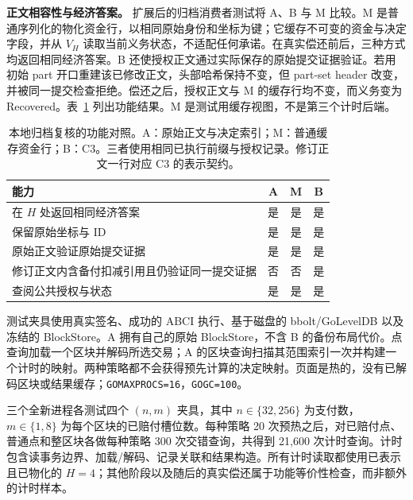 \noindent\textbf{正文相容性与经济答案。}
扩展后的归档消费者测试将 A、B 与 M 比较。M 是普通序列化的物化资金行，以相同原始身份和坐标为键；它缓存不可变的资金与决定字段，并从 $V_H$ 读取当前义务状态，不适配任何承诺。在真实偿还前后，三种方式均返回相同经济答案。B 还使授权正文通过实际保存的原始提交证据验证。若用初始 part 开口重建该已修改正文，头部哈希保持不变，但 part-set header 改变，并被同一提交检查拒绝。偿还之后，授权正文与 M 的缓存行均不变，而义务变为 Recovered。表~\ref{tab:c3-function} 列出功能结果。M 是测试用缓存视图，不是第三个计时后端。

\begin{table}[t]
  \centering
  \caption{本地归档复核的功能对照。A：原始正文与决定索引；M：普通缓存资金行；B：C3。三者使用相同已执行前缀与授权记录。修订正文一行对应 C3 的表示契约。}
  \label{tab:c3-function}
  \small
  \begin{tabular}{@{}p{}ccc@{}}
    \toprule
    能力 & A & M & B \\
    \midrule
    在 $H$ 处返回相同经济答案 & 是 & 是 & 是 \\
    保留原始坐标与 ID & 是 & 是 & 是 \\
    原始正文验证原始提交证据 & 是 & 是 & 是 \\
    修订正文内含备付扣减引用且仍验证同一提交证据 & 否 & 否 & 是 \\
    查阅公共授权与状态 & 是 & 是 & 是 \\
    \bottomrule
  \end{tabular}
\end{table}

测试夹具使用真实签名、成功的 ABCI 执行、基于磁盘的 bbolt/GoLevelDB 以及冻结的 BlockStore。A 拥有自己的原始 BlockStore，不含 B 的备份布局代价。点查询加载一个区块并解码所选交易；A 的区块查询扫描其范围索引一次并构建一个计时的映射。两种策略都不会获得预先计算的决定映射。页面是热的，没有已解码区块或结果缓存；\texttt{GOMAXPROCS=16}，\texttt{GOGC=100}。

三个全新进程各测试四个 $(n,m)$ 夹具，其中 $n\in\{32,256\}$ 为支付数，$m\in\{1,8\}$ 为每个区块的已赔付槽位数。每种策略 20 次预热之后，对已赔付点、普通点和整区块各做每种策略 300 次交错查询，共得到 21,600 次计时查询。计时包含读事务边界、加载/解码、记录关联和结果构造。所有计时读取都使用已表示且已物化的 $H=4$；其他阶段以及随后的真实偿还属于功能等价性检查，而非额外的计时样本。

